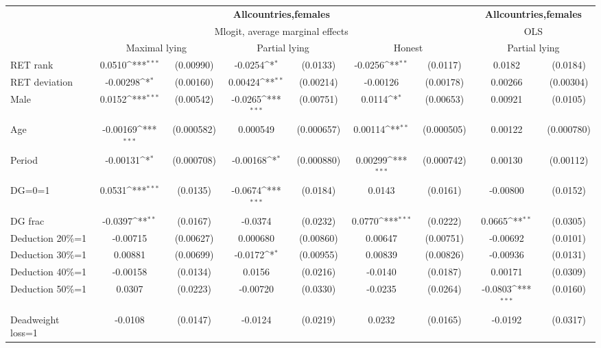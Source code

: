 \def\sym#1{\ifmmode^{#1}\else\(^{#1}\)\fi}
\begin{tabular}{l|cccccc|cc}
\hline\hline
&\multicolumn{6}{c|}{\bf All\space{}countries,\space{}females}&\multicolumn{2}{c}{\bf All\space{}countries,\space{}females}\\ &\multicolumn{6}{c|}{Mlogit, average marginal effects }&\multicolumn{2}{c}{OLS}\\
                &\multicolumn{2}{c}{Maximal lying}&\multicolumn{2}{c}{Partial lying}&\multicolumn{2}{c}{Honest}  &\multicolumn{2}{c}{Partial lying}\\
\hline
RET rank        &   0.0510\sym{***}&(0.00990)&  -0.0254\sym{*}  & (0.0133)&  -0.0256\sym{**} & (0.0117)&   0.0182         & (0.0184)\\
RET deviation   & -0.00298\sym{*}  &(0.00160)&  0.00424\sym{**} &(0.00214)& -0.00126         &(0.00178)&  0.00266         &(0.00304)\\
Male            &   0.0152\sym{***}&(0.00542)&  -0.0265\sym{***}&(0.00751)&   0.0114\sym{*}  &(0.00653)&  0.00921         & (0.0105)\\
Age             & -0.00169\sym{***}&(0.000582)& 0.000549         &(0.000657)&  0.00114\sym{**} &(0.000505)&  0.00122         &(0.000780)\\
Period          & -0.00131\sym{*}  &(0.000708)& -0.00168\sym{*}  &(0.000880)&  0.00299\sym{***}&(0.000742)&  0.00130         &(0.00112)\\
DG=0=1          &   0.0531\sym{***}& (0.0135)&  -0.0674\sym{***}& (0.0184)&   0.0143         & (0.0161)& -0.00800         & (0.0152)\\
DG frac         &  -0.0397\sym{**} & (0.0167)&  -0.0374         & (0.0232)&   0.0770\sym{***}& (0.0222)&   0.0665\sym{**} & (0.0305)\\
Deduction 20\%=1& -0.00715         &(0.00627)& 0.000680         &(0.00860)&  0.00647         &(0.00751)& -0.00692         & (0.0101)\\
Deduction 30\%=1&  0.00881         &(0.00699)&  -0.0172\sym{*}  &(0.00955)&  0.00839         &(0.00826)& -0.00936         & (0.0131)\\
Deduction 40\%=1& -0.00158         & (0.0134)&   0.0156         & (0.0216)&  -0.0140         & (0.0187)&  0.00171         & (0.0309)\\
Deduction 50\%=1&   0.0307         & (0.0223)& -0.00720         & (0.0330)&  -0.0235         & (0.0264)&  -0.0803\sym{***}& (0.0160)\\
Deadweight loss=1&  -0.0108         & (0.0147)&  -0.0124         & (0.0219)&   0.0232         & (0.0165)&  -0.0192         & (0.0317)\\

\end{tabular}
